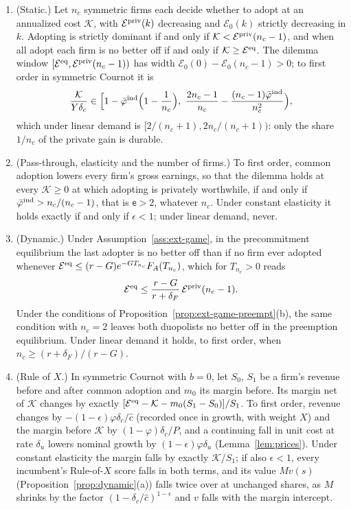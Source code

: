 \begin{proposition}\label{prop:ext-game-pd}
\begin{enumerate}
\item[(a)] (Static.) Let $n_c$ symmetric firms each decide whether to adopt at an annualized cost $\mathcal K$, with $\mathcal E^{\rm priv}(k)$ decreasing and $\mathcal E_0(k)$ strictly decreasing in $k$. Adopting is strictly dominant if and only if $\mathcal K<\mathcal E^{\rm priv}(n_c-1)$, and when all adopt each firm is no better off if and only if $\mathcal K\ge\mathcal E^{\rm eq}$. The dilemma window $[\mathcal E^{\rm eq},\mathcal E^{\rm priv}(n_c-1))$ has width $\mathcal E_0(0)-\mathcal E_0(n_c-1)>0$; to first order in symmetric Cournot it is
\begin{equation}\label{eq:ext-game-window}
\frac{\mathcal K}{Y\delta_c}\in\Bigl[1-\bar\varphi^{\rm ind}\Bigl(1-\frac1{n_c}\Bigr),\ \frac{2n_c-1}{n_c}-\frac{(n_c-1)\bar\varphi^{\rm ind}}{n_c^2}\Bigr),
\end{equation}
which under linear demand is $[2/(n_c+1),2n_c/(n_c+1))$: only the share $1/n_c$ of the private gain is durable.
\item[(b)] (Pass-through, elasticity and the number of firms.) To first order, common adoption lowers every firm's gross earnings, so that the dilemma holds at every $\mathcal K\ge0$ at which adopting is privately worthwhile, if and only if $\bar\varphi^{\rm ind}>n_c/(n_c-1)$, that is $\mathsf e>2$, whatever $n_c$. Under constant elasticity it holds exactly if and only if $\epsilon<1$; under linear demand, never.
\item[(c)] (Dynamic.) Under Assumption~\ref{ass:ext-game}, in the precommitment equilibrium the last adopter is no better off than if no firm ever adopted whenever $\mathcal E^{\rm eq}\le(r-G)e^{-GT_{n_c}}F_A(T_{n_c})$, which for $T_{n_c}>0$ reads
\begin{equation}\label{eq:ext-game-dyn}
\mathcal E^{\rm eq}\le\frac{r-G}{r+\delta_F}\,\mathcal E^{\rm priv}(n_c-1).
\end{equation}
Under the conditions of Proposition~\ref{prop:ext-game-preempt}(b), the same condition with $n_c=2$ leaves both duopolists no better off in the preemption equilibrium. Under linear demand it holds, to first order, when $n_c\ge(r+\delta_F)/(r-G)$.
\item[(d)] (Rule of $X$.) In symmetric Cournot with $b=0$, let $S_0$, $S_1$ be a firm's revenue before and after common adoption and $m_0$ its margin before. Its margin net of $\mathcal K$ changes by exactly $[\mathcal E^{\rm eq}-\mathcal K-m_0(S_1-S_0)]/S_1$. To first order, revenue changes by $-(1-\epsilon)\varphi\delta_c/\hat c$ (recorded once in growth, with weight $X$) and the margin before $\mathcal K$ by $(1-\varphi)\delta_c/P$, and a continuing fall in unit cost at rate $\delta_u$ lowers nominal growth by $(1-\epsilon)\varphi\delta_u$ (Lemma~\ref{lem:prices}). Under constant elasticity the margin falls by exactly $\mathcal K/S_1$; if also $\epsilon<1$, every incumbent's Rule-of-$X$ score falls in both terms, and its value $Mv(s)$ (Proposition~\ref{prop:dynamic}(a)) falls twice over at unchanged shares, as $M$ shrinks by the factor $(1-\delta_c/\hat c)^{1-\epsilon}$ and $v$ falls with the margin intercept.

\end{enumerate}
\end{proposition}
